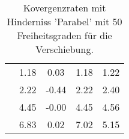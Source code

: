 \begin{table}
\begin{tabular}{c|cc|cc|}
\multicolumn{1}{|c|}{} & \multicolumn{1}{|c|}{      1.18} & \multicolumn{1}{|c|}{      0.03} & \multicolumn{1}{|c|}{      1.18} & \multicolumn{1}{|c|}{      1.22} \\ 
\multicolumn{1}{|c|}{} & \multicolumn{1}{|c|}{      2.22} & \multicolumn{1}{|c|}{     -0.44} & \multicolumn{1}{|c|}{      2.22} & \multicolumn{1}{|c|}{      2.40} \\ 
\multicolumn{1}{|c|}{} & \multicolumn{1}{|c|}{      4.45} & \multicolumn{1}{|c|}{     -0.00} & \multicolumn{1}{|c|}{      4.45} & \multicolumn{1}{|c|}{      4.56} \\ 
\multicolumn{1}{|c|}{} & \multicolumn{1}{|c|}{      6.83} & \multicolumn{1}{|c|}{      0.02} & \multicolumn{1}{|c|}{      7.02} & \multicolumn{1}{|c|}{      5.15} \\ 
\hline 
\end{tabular}\caption{Kovergenzraten mit Hinderniss 'Parabel' mit 50 Freiheitsgraden für die Verschiebung.}\label{tab:Rate_Parabel_level1}
\end{table} 
